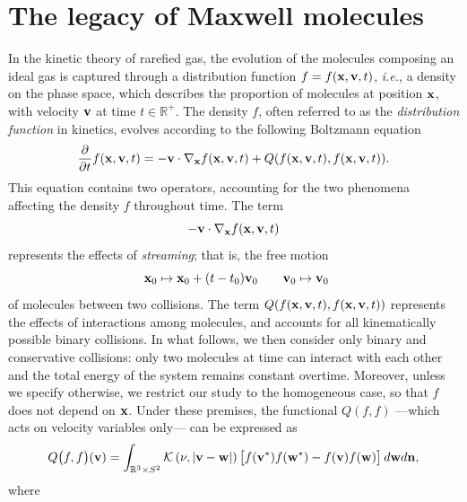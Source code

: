 \documentclass{article}
\newcommand{\bv}{\mathrm{BV}}
\newcommand{\R}{\mathbb R}
\def\R{\mathbb{R}}
\def\bx{{\bf x}}
\def\bv{{\bf v}}
\def\bw{{\bf w}}
\begin{document}
\section{The legacy of Maxwell molecules}\label{sec:Maxwell}
% 
% 
In the kinetic theory of rarefied gas, the evolution of the molecules composing an ideal gas is captured through a distribution function $f=f(\bx,\bv,t)$, \textit{i.e.}, a density on the phase space, which describes the proportion of molecules at position $\bx$, with velocity $\bv$ at time $t \in \R^+$.
% 
The density $f$, often referred to as the \emph{distribution function} in kinetics, evolves according to the following Boltzmann equation\cite{Cer,CIP}
% 
\begin{equation}
    \label{Boltz}
    {\partial\over \partial t}f(\bx,\bv,t) = -\bv\cdot\nabla_\bx f(\bx,\bv,t) + Q(f(\bx,\bv,t),f(\bx,\bv,t)).
\end{equation}
% 
This equation contains two operators, accounting for the two phenomena affecting the density $f$ throughout time.
% 
The term $$-\bv\cdot\nabla_\bx f(\bx,\bv,t)$$ represents the effects of {\it streaming}; that is, the free motion
\[\
    \bx_0 \mapsto \bx_0 + (t-t_0)\bv_0\qquad \bv_0 \mapsto \bv_0
\]
of molecules between two collisions. 
% 
The term $Q(f(\bx,\bv,t),f(\bx,\bv,t))$ represents the effects of interactions among molecules, and accounts for all kinematically possible binary collisions.
% 
% 
In what follows, we then consider only binary and conservative collisions: only two molecules at time can interact with each other and the total energy of the system remains constant overtime.
% 
Moreover, unless we specify otherwise, we restrict our study to the homogeneous case, so that $f$ does not depend on $\bx$.
% 
Under these premises, the functional $Q(f,f)$ ---which acts on velocity variables only--- can be expressed as
% 
\begin{equation}
    \label{colli}
    Q\bigl(f,f\bigr)(\bv) = \int_{{\R}^3\times{S^2}} \mathcal{K}\left(\nu, {|\bv-\bw|} \right) \big[f( \bv^*)f( \bw^*)-f( \bv)f( \bw)  \big]\, d \bw d{\bf n},
\end{equation}
% 
where
% 
\end{document}
